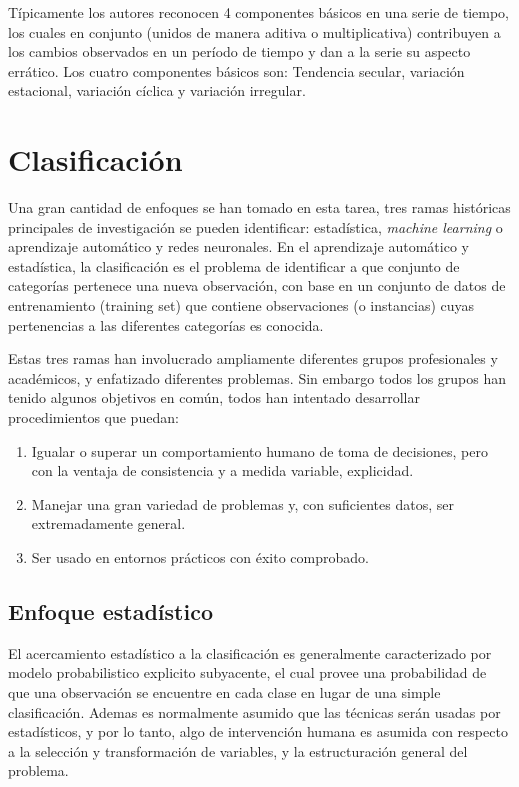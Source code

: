 Típicamente los autores reconocen 4 componentes básicos en una serie de tiempo, los cuales en conjunto (unidos de manera aditiva o multiplicativa) contribuyen a los cambios observados en un período de tiempo y dan a la serie su aspecto errático.
Los cuatro componentes básicos son: Tendencia secular, variación estacional, variación cíclica y variación irregular.

\section{Clasificación}

Una gran cantidad de enfoques se han tomado en esta tarea, tres ramas históricas principales de investigación se pueden identificar: estadística, \textit{machine learning} o aprendizaje automático y redes neuronales. 
En el aprendizaje automático y estadística, la clasificación es el problema de identificar a que conjunto de categorías pertenece una nueva observación, con base en un conjunto de datos de entrenamiento (training set) que contiene observaciones  (o instancias) cuyas pertenencias a las diferentes categorías es conocida.

Estas tres ramas han involucrado ampliamente diferentes grupos profesionales y académicos, y enfatizado diferentes problemas.
Sin embargo todos los grupos han tenido algunos objetivos en común, todos han intentado desarrollar procedimientos que puedan:

\begin{enumerate}
	\item Igualar o superar un comportamiento humano de toma de decisiones, pero con la ventaja de consistencia y a medida variable, explicidad.
	\item Manejar una gran variedad de problemas y, con suficientes datos, ser extremadamente general.
	\item Ser usado en entornos prácticos con éxito comprobado.
\end{enumerate}

\subsection{Enfoque estadístico}
El acercamiento estadístico a la clasificación es generalmente caracterizado por modelo probabilistico explicito subyacente, el cual provee una probabilidad de que una observación se encuentre en cada clase en lugar de una simple clasificación. Ademas es normalmente asumido que las técnicas serán usadas por estadísticos, y por lo tanto, algo de intervención humana es asumida con respecto a la selección y transformación de variables, y la estructuración general del problema.

